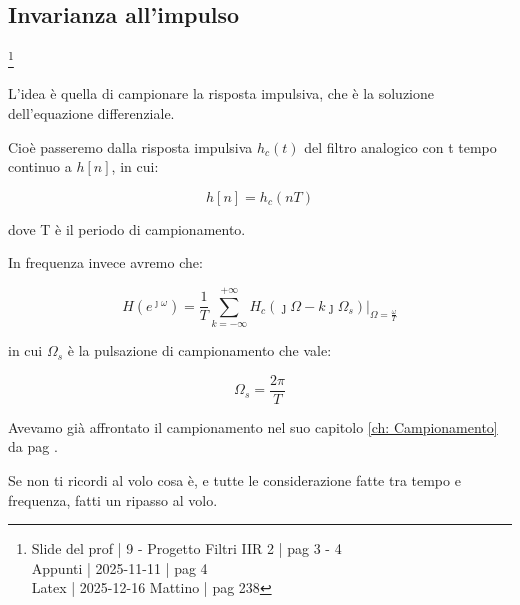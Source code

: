 \newpage 

\subsection{Invarianza all'impulso}

\footnote{ 
    Slide del prof | 9 - Progetto Filtri IIR 2 | pag 3 - 4\\ 
    Appunti | 2025-11-11 | pag 4 \\
    Latex | 2025-12-16 Mattino | pag 238 
} 

L'idea è quella di campionare la risposta impulsiva, che è la soluzione dell'equazione differenziale. \newline 

Cioè passeremo dalla risposta impulsiva $h_c \left(t\right)$ del filtro analogico con t tempo continuo a $h \left[ n\right]$, in cui: 

{
    \Large 
    \begin{equation}
        h \left[ n\right] = h_c \left(n T\right)
    \end{equation}
}

dove T è il periodo di campionamento. \newline 

In frequenza invece avremo che: 

{
    \Large 
    \begin{equation}
        H \left(e^{\jmath \omega}\right)
        = 
        \dfrac{1}{T}
        \sum_{k = - \infty}^{+ \infty}
        \left. 
            H_c \left(\jmath \Omega - k \jmath \Omega_s\right)
        \right|_{\Omega = \frac{\omega}{T}}
    \end{equation}
}

in cui $\Omega_s$ è la pulsazione di campionamento che vale: 

{
    \Large 
    \begin{equation}
        \Omega_s = \dfrac{2 \pi}{T}
    \end{equation}
}

\begin{tcolorbox}
    Avevamo già affrontato il campionamento nel suo capitolo \ref{ch: Campionamento}  da pag \pageref{ch: Campionamento}. \newline 
    
    Se non ti ricordi al volo cosa è, e tutte le considerazione fatte tra tempo e frequenza, fatti un ripasso al volo. 
\end{tcolorbox}

